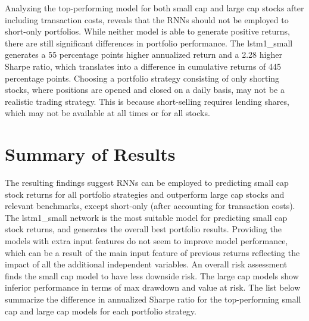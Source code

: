 \indent\newline 
Analyzing the top-performing model for both small cap and large cap stocks after including transaction costs, reveals that the RNNs should not be employed to short-only portfolios. While neither model is able to generate positive returns, there are still significant differences in portfolio performance. The lstm1\_small generates a 55 percentage points higher annualized return and a 2.28 higher Sharpe ratio, which translates into a difference in cumulative returns of 445 percentage points. Choosing a portfolio strategy consisting of only shorting stocks, where positions are opened and closed on a daily basis, may not be a realistic trading strategy. This is because short-selling requires lending shares, which may not be available at all times or for all stocks. 

\section{Summary of Results}
The resulting findings suggest RNNs can be employed to predicting small cap stock returns for all portfolio strategies and outperform large cap stocks and relevant benchmarks, except short-only (after accounting for transaction costs). The lstm1\_small network is the most suitable model for predicting small cap stock returns, and generates the overall best portfolio results. Providing the models with extra input features do not seem to improve model performance, which can be a result of the main input feature of previous returns reflecting the impact of all the additional independent variables. An overall risk assessment finds the small cap model to have less downside risk. The large cap models show inferior performance in terms of max drawdown and value at risk. The list below summarize the difference in annualized Sharpe ratio for the top-performing small cap and large cap models for each portfolio strategy.

\indent\newline
\begin{table}[ht]
\centering
\caption{\textbf{Best Annualized Sharpe ratio prior to transaction costs - small vs large}}
\end{table}

